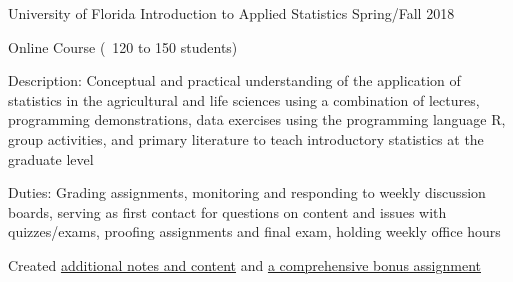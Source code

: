 

\begin{cventries}

  \cventry
    {University of Florida} %
    {Introduction to Applied Statistics} %
    {} %
    {Spring/Fall 2018} %
    {
      \begin{cvitems} %
    \item {Online Course (~120 to 150 students)}
        \item {Description: Conceptual and practical understanding of the application of statistics in the agricultural and life sciences using a combination of lectures, programming demonstrations, data exercises using the programming language R, group activities, and primary literature to teach introductory statistics at the graduate level}
        \item {Duties: Grading assignments, monitoring and responding to weekly discussion boards, serving as first contact for questions on content and issues with quizzes/exams, proofing assignments and final exam, holding weekly office hours}
        \item {Created \href{https://sta6093.justinmillar.com/}{additional notes and content} and \href{https://justinmillar.github.io/STA6093/ps01_nba-scout.html}{a comprehensive bonus assignment}}
      \end{cvitems}
    }


\end{cventries}
